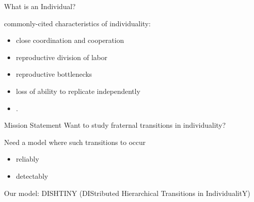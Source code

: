 \begin{frame}{What is an Individual?}

commonly-cited characteristics of individuality:
\begin{itemize}
\item close coordination and cooperation
\item reproductive division of labor
\item reproductive bottlenecks
\item loss of ability to replicate independently
\item \cite{ereshefsky2015rethinking, bouchard2013symbiotic}.
\end{itemize}

\end{frame}

\begin{frame}{Mission Statement}
Want to study fraternal transitions in individuality?

\pause
\vspace{2ex}

Need a model where such transitions to occur
\begin{itemize}
\item reliably
\item detectably
\end{itemize}

\pause
\vspace{2ex}

Our model: DISHTINY \footnotesize{(DIStributed Hierarchical Transitions in IndividualitY)}

\end{frame}
